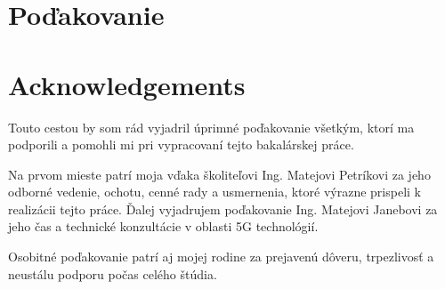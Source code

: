 \thispagestyle{empty}

\vspace*{\fill}

\ifx\FIITlagEN\undefined
\section*{Poďakovanie}
\else
\section*{Acknowledgements}
\fi

Touto cestou by som rád vyjadril úprimné poďakovanie všetkým, ktorí ma podporili a pomohli mi pri vypracovaní tejto bakalárskej práce.

Na prvom mieste patrí moja vďaka školiteľovi Ing. Matejovi Petríkovi za jeho odborné vedenie, ochotu, cenné rady a usmernenia, ktoré výrazne prispeli k realizácii tejto práce. Ďalej vyjadrujem poďakovanie Ing. Matejovi Janebovi za jeho čas a technické konzultácie v oblasti 5G technológií.

Osobitné poďakovanie patrí aj mojej rodine za prejavenú dôveru, trpezlivosť a neustálu podporu počas celého štúdia.

\emptypage